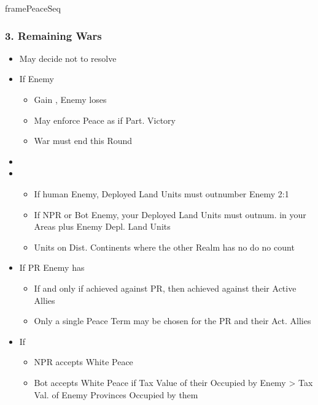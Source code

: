 \documentclass[10pt]{article}
\newlength{\fhPeaceSeq} \setlength\fhPeaceSeq{32\baselineskip}
\begin{document}
\begin{dynamiccontents*}{framePeaceSeq}
\begin{eubox}{\fhPeaceSeq}
\begin{multicols}{2}
		\subsubsection*{3. Remaining Wars}
		\begin{itemize}
			\item May decide not to resolve
			\item If Enemy 
			\begin{itemize}
				\item Gain \p2, Enemy loses 
				\item May enforce Peace as if Part. Victory
				\item War must end this Round
			\end{itemize}
			\item {}
			\item {}
			\begin{itemize}
				\item If human Enemy, Deployed Land Units must outnumber Enemy 2:1
				\item If NPR or Bot Enemy, your Deployed Land Units must outnum. \rebels in your Areas plus Enemy Depl. Land Units
				\item Units on Dist. Continents where the other Realm has no \towns do no count
			\end{itemize}
			\item If PR Enemy has 
			\begin{itemize}
				\item If and only if achieved against PR, then achieved against their Active Allies
				\item Only a single Peace Term may be chosen for the PR and their Act. Allies
			\end{itemize}
			\item If 
			\begin{itemize}
				\item NPR accepts White Peace
				\item Bot accepts White Peace if Tax Value of their \towns Occupied by Enemy > Tax Val. of Enemy Provinces Occupied by them
			\end{itemize}
		\end{itemize}


\end{multicols}
\end{eubox}
\end{dynamiccontents*}
\end{document}
